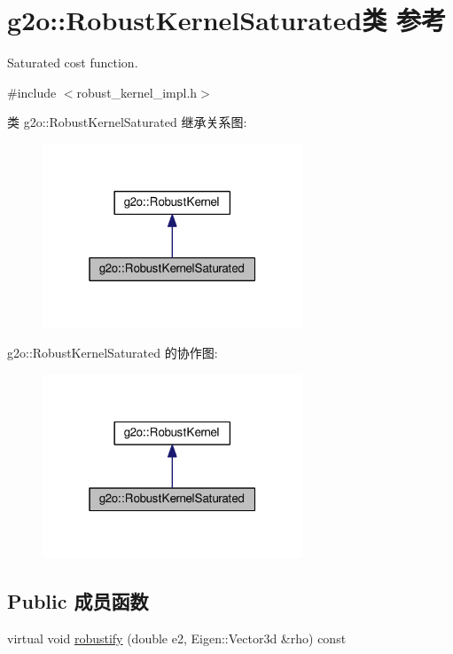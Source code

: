 \hypertarget{classg2o_1_1RobustKernelSaturated}{\section{g2o\-:\-:Robust\-Kernel\-Saturated类 参考}
\label{classg2o_1_1RobustKernelSaturated}
}


Saturated cost function.  




{\ttfamily \#include $<$robust\-\_\-kernel\-\_\-impl.\-h$>$}



类 g2o\-:\-:Robust\-Kernel\-Saturated 继承关系图\-:
\nopagebreak
\begin{figure}[H]
\begin{center}
\leavevmode
\includegraphics[width=220pt]{classg2o_1_1RobustKernelSaturated__inherit__graph}
\end{center}
\end{figure}


g2o\-:\-:Robust\-Kernel\-Saturated 的协作图\-:
\nopagebreak
\begin{figure}[H]
\begin{center}
\leavevmode
\includegraphics[width=220pt]{classg2o_1_1RobustKernelSaturated__coll__graph}
\end{center}
\end{figure}
\subsection*{Public 成员函数}
\begin{DoxyCompactItemize}
\item 
virtual void \hyperlink{classg2o_1_1RobustKernelSaturated_abfae37d6c54155859549ac710a8a8c83}{robustify} (double e2, Eigen\-::\-Vector3d \&rho) const 
\end{DoxyCompactItemize}
